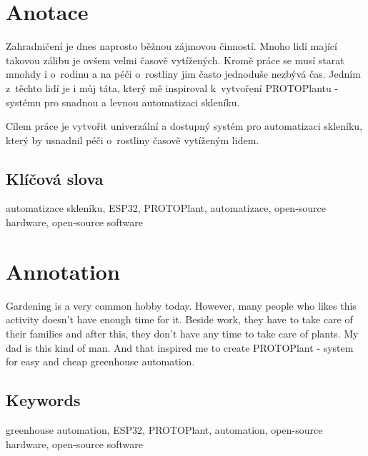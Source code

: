 \documentclass{template/socthesis}
\author{Petr Štourač}
\begin{document}
\maketitle



\pagestyle{empty}

\section*{Anotace}
Zahradničení je dnes naprosto běžnou zájmovou činností. Mnoho lidí mající takovou zálibu je ovšem velmi časově vytížených. Kromě práce se musí starat mnohdy i o~rodinu a na péči o~rostliny jim často jednoduše nezbývá čas. Jedním z~těchto lidí je i můj táta, který mě inspiroval k~vytvoření PROTOPlantu - systému pro snadnou a levnou automatizaci skleníku. 

Cílem práce je vytvořit univerzální a dostupný systém pro automatizaci skleníku, který by usnadnil péči o~rostliny časově vytíženým lidem. 

\subsection*{Klíčová slova}
automatizace skleníku, ESP32, PROTOPlant, automatizace, open-source hardware, open-source software

\vspace{20mm}

\section*{Annotation}
Gardening is a very common hobby today. However, many people who likes this activity doesn't have enough time for it. Beside work, they have to take care of their families and after this, they don't have any time to take care of plants. My dad is this kind of man. And that inspired me to create PROTOPlant - system for easy and cheap greenhouse automation.


\subsection*{Keywords}
greenhouse automation, ESP32, PROTOPlant, automation, open-source hardware, open-source software
\end{document}
